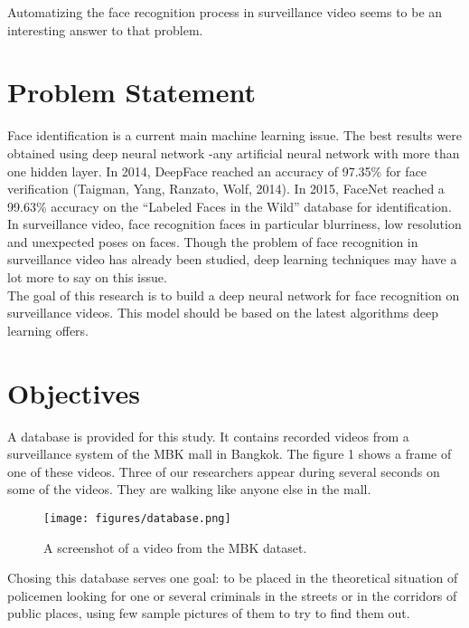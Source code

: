 Automatizing the face recognition process in surveillance video seems to be an interesting answer to that problem.\\


\section{Problem Statement}

 Face identification is a current main machine learning issue. The best results were obtained using deep neural network -any artificial neural network with more than one hidden layer. In 2014, DeepFace reached an accuracy of 97.35\% for face verification (Taigman, Yang, Ranzato, Wolf, 2014). In 2015, FaceNet reached a 99.63\% accuracy on the \enquote{Labeled Faces in the Wild} database for identification.\\


In surveillance video, face recognition faces in particular blurriness, low resolution and unexpected poses on faces. Though the problem of face recognition in surveillance video has already been studied, deep learning techniques may have a lot more to say on this issue.\\

The goal of this research is to build a deep neural network for face recognition on surveillance videos. This model should be based on the latest algorithms deep learning offers.

\section{Objectives}

A database is provided for this study. It contains recorded videos from a surveillance system of the MBK mall in Bangkok. The figure 1 shows a frame of one of these videos. Three of our researchers appear during several seconds on some of the videos. They are walking like anyone else in the mall.\\

\begin{figure}[t]
  \centering
  \texttt{[image: figures/database.png]}  
  \caption[A screenshot of a video from the MBK dataset.]{A screenshot of a video from the MBK dataset.}
  \label{fig:example}
\end{figure}

Chosing this database serves one goal: to be placed in the theoretical situation of policemen looking for one or several criminals in the streets or in the corridors of public places, using few sample pictures of them to try to find them out.\\

